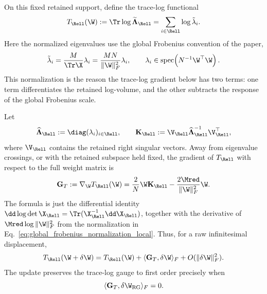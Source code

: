 On this fixed retained support, define the trace-log functional
\begin{equation}
  T_{\Rell}(\W)
  :=
  \Tr\log\widetilde{\boldsymbol\Lambda}_{\Rell}
  =
  \sum_{i\in\Rell}\log\tilde\lambda_i .
  \label{eq:TR_local_functional}
\end{equation}
Here the normalized eigenvalues use the global Frobenius convention of the paper,
\begin{equation}
  \tilde\lambda_i
  =
  \frac{M}{\Tr\X}\lambda_i
  =
  \frac{MN}{\|\W\|_F^2}\lambda_i,
  \qquad
  \lambda_i\in\operatorname{spec}\!\left(N^{-1}\W^\top\W\right).
  \label{eq:global_frobenius_normalization_local}
\end{equation}
This normalization is the reason the trace-log gradient below has two terms: one term differentiates the retained log-volume, and the other subtracts the response of the global Frobenius scale.

Let
\begin{equation}
  \widehat{\boldsymbol\Lambda}_{\Rell}
  :=
  \diag(\lambda_i)_{i\in\Rell},
  \qquad
  \mathbf K_{\Rell}
  :=
  \V_{\Rell}\widehat{\boldsymbol\Lambda}_{\Rell}^{-1}\V_{\Rell}^{\top},
  \label{eq:KR_definition}
\end{equation}
where \(\V_{\Rell}\) contains the retained right singular vectors.  Away from eigenvalue crossings, or with the retained subspace held fixed, the gradient of \(T_{\Rell}\) with respect to the full weight matrix is
\begin{equation}
  \mathbf G_T
  :=
  \nabla_{\W}T_{\Rell}(\W)
  =
  \frac{2}{N}\W\mathbf K_{\Rell}
  -
  \frac{2\Mred}{\|\W\|_F^2}\W .
  \label{eq:GT_trace_normalized}
\end{equation}
The formula is just the differential identity
\(\dd\log\det\X_{\Rell}=\Tr(\X_{\Rell}^{-1}\dd\X_{\Rell})\), together with the derivative of \(\Mred\log\|\W\|_F^2\) from the normalization in Eq.~\eqref{eq:global_frobenius_normalization_local}.  Thus, for a raw infinitesimal displacement,
\begin{equation}
  T_{\Rell}(\W+\delta\W)
  =
  T_{\Rell}(\W)
  +
  \langle\mathbf G_T,\delta\W\rangle_F
  +
  O(\|\delta\W\|_F^2).
  \label{eq:trace_log_linearization}
\end{equation}
The update preserves the trace-log gauge to first order precisely when
\begin{equation}
  \langle\mathbf G_T,\delta\W_{\rm RG}\rangle_F=0.
  \label{eq:trace_log_tangent_condition}
\end{equation}

